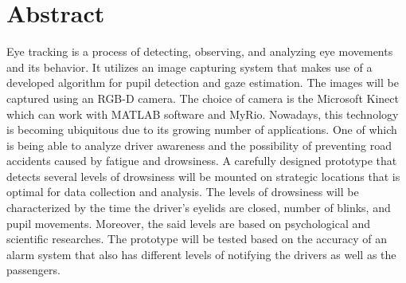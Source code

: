 \chapter*{Abstract}

\begin{comment}
Keep your abstract short by giving the gist/nutshell of your \MakeTextLowercase{\documentType}.	 Use the following checklist questions to help you in crafting your abstract.	

\begin{itemize}
	\item[$\square$] Did you briefly state what you intend to do?  
	\item[$\square$] Did you concisely discuss the problem statement?
	\item[$\square$] Did you tersely mention the objectives in general terms? 
	\item[$\square$] Did you succinctly describe the methodology for the target audience?
	\item[$\square$] Did you strongly describe your significant results and your conclusions?
\end{itemize}
\end{comment}
 Eye tracking is a process of detecting, observing, and analyzing eye movements and its behavior. It utilizes an image capturing system that makes use of a developed algorithm for pupil detection and gaze estimation.  The images will be captured using an RGB-D camera. The choice of camera is the Microsoft Kinect which can work with MATLAB software and MyRio. Nowadays, this technology is becoming ubiquitous due to its growing number of applications. One of which is being able to analyze driver awareness and the possibility of preventing road accidents caused by fatigue and drowsiness. A carefully designed prototype that detects several levels of drowsiness will be mounted on strategic locations that is optimal for data collection and analysis. The levels of drowsiness will be characterized by the time the driver’s eyelids are closed, number of blinks, and pupil movements. Moreover, the said levels are based on psychological and scientific researches. The prototype will be tested based on the accuracy of an alarm system that also has different levels of notifying the drivers as well as the passengers. 

